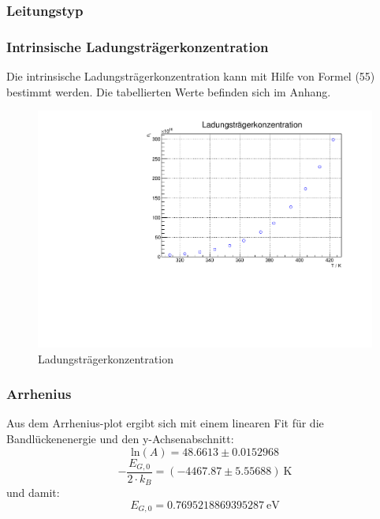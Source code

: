 \FloatBarrier
\subsubsection{Leitungstyp}


\FloatBarrier
\subsubsection{Intrinsische Ladungsträgerkonzentration}
Die intrinsische Ladungsträgerkonzentration kann mit Hilfe von Formel (55) bestimmt werden. Die tabellierten Werte befinden sich im Anhang.

\begin{figure}
\label{fig:leitin}
\centering
\includegraphics[scale = 0.5]{../data/A4.pdf}
\caption{Ladungsträgerkonzentration}
\end{figure}



\subsubsection{Arrhenius}
\FloatBarrier

Aus dem Arrhenius-plot ergibt sich mit einem linearen Fit für die Bandlückenenergie und den y-Achsenabschnitt:
$$\text{ln}(A) = 48.6613 \pm 0.0152968 $$
$$ - \frac{E_{G,0}}{2 \cdot k_B} = (-4467.87 \pm 5.55688 ) \ \text{K}$$
und damit:
$$E_{G,0} = 0.7695218869395287 \ \text{eV} $$

